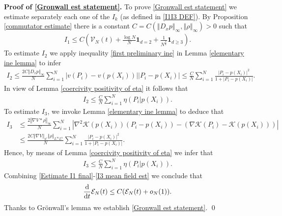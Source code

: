 \documentclass[11pt,reqno]{amsart}
\numberwithin{equation}{section}
\def\dd{{\rm d}}
\begin{document}
\textbf{Proof of \eqref{Gronwall est statement}.} To prove \eqref{Gronwall est statement} we estimate separately each one of the $I_{k}$ (as defined in \eqref{I1I3 DEF}). By Proposition \ref{commutator estimate} there is a constant $C=C(\left\Vert D_{x}p\right\Vert_{\infty},\left\Vert \rho\right\Vert_{\infty})>0$ such that   
\begin{align}
I_{1}\leq C\left(\mathcal{V}_{N}(t)+\frac{\log N}{N}\mathbf{1}_{d=2}+\frac{1}{N^{\frac{2}{d}}}\mathbf{1}_{d\geq3}\right). 
\label{Estimate I1 final}
\end{align}
To estimate $I_{2}$ we apply inequality \eqref{first preliminary ine} in Lemma \ref{elementary ine lemma} to infer 
\begin{align*}
I_{2}\leq \frac{2C\left\Vert D_{x}p\right\Vert_{\infty}}{N}\sum_{i=1}^{N}\left\vert v(P_{i})-v(p(X_{i}))\right\vert \left\vert P_{i}-p(X_{i})\right\vert\leq \frac{C}{N}\sum_{i=1}^{N}\frac{\left\vert P_{i}-p(X_{i})\right\vert^{2} }{1+\left\vert P_{i}-p(X_{i})\right\vert}.        
\end{align*}
In view of Lemma \ref{coercivity positivity of eta} it follows that 
\begin{align}
I_{2}\leq \frac{C}{N}\sum_{i=1}^{N}\eta(P_{i}\vert p(X_{i})). \label{I2 mean field est}     
\end{align}
To estimate $I_{3}$, we invoke Lemma \ref{elementary ine lemma} to deduce that 
\begin{align*}
I_{3}&\leq \frac{2\left\Vert \nabla V\ast \rho\right\Vert_{\infty} }{N}\sum_{i=1}^{N}\left\vert \nabla^{2} \mathscr{K}(p(X_{i}))(P_{i}-p(X_{i}))-(\nabla \mathscr{K}(P_{i})-\mathscr{K}(p(X_{i})))\right\vert\\
&\leq \frac{2C\left\Vert \nabla V\right\Vert_{a'} \left\Vert \rho\right\Vert_{L^{\infty}L^{a}
}}{N}\sum_{i=1}^{N}\frac{\left\vert P_{i}-p(X_{i})\right\vert^{2} }{1+\left\vert P_{i}-p(X_{i})\right\vert }.     
\end{align*}
Hence, by means of Lemma \ref{coercivity positivity of eta} we infer that 
\begin{align}
I_{3}\leq \frac{C}{N}\sum_{i=1}^{N}\eta(P_{i}\vert p(X_{i})). \label{I3 mean field est}    
\end{align}
Combining \eqref{Estimate I1 final}-\eqref{I3 mean field est} we conclude that 
\begin{align*}
\frac{\dd}{\dd t}\mathcal{E}_{N}(t)\leq C(\mathcal{E}_{N}(t)+o_{N}(1)).    
\end{align*}
Thanks to Gr\"onwall's lemma we establish \eqref{Gronwall est statement}. 
\qed 
\end{document}
